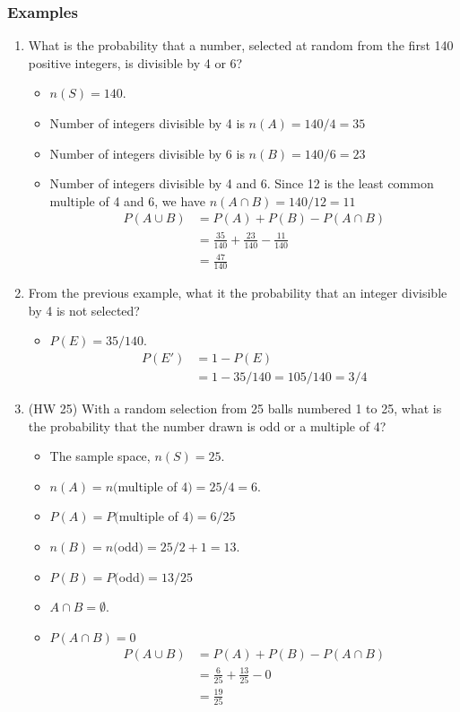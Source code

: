 \documentclass[14pt]{extarticle}
\begin{document}
\subsubsection{Examples}
\begin{enumerate}
	\item What is the probability that a number, selected at random from the first 140 positive integers, is divisible by 4 or 6?
	\begin{itemize}
		\item $n(S)= 140$.
		\item Number of integers divisible by 4 is $n(A) = 140/4 =35$
		\item Number of integers divisible by 6 is $n(B) = 140/6 =23$
		\item Number of integers divisible by 4 and 6. Since 12 is the least common multiple of 4 and 6, we have $n(A\cap B) = 140/12 =11$
		\begin{align*}
			P(A\cup B) &= P(A) + P(B) -P(A\cap B) \\
			& = \frac{35}{140}+ \frac{23}{140} - \frac{11}{140} \\
			& = \frac{47}{140}
		\end{align*}
	\end{itemize}
	\item From the previous example, what it the probability that an integer divisible by 4 is not selected?
	\begin{itemize}
		\item $P(E)= 35/140$.
		\begin{align*}
			P(E') &= 1-P(E) \\
			&= 1-35/140 = 105/140 = 3/4
		\end{align*}
	\end{itemize}
	\item (HW 25) With a random selection from 25 balls numbered 1 to 25, what is the probability that the number drawn is odd or a multiple of 4?
	\begin{itemize}
		\item The sample space, $n(S)=25$.
		\item $n(A) = n($multiple of 4$) = 25/4 = 6$.
		\item $P(A)=P($multiple of 4$) =6/25$
		\item $n(B) = n($odd$) = 25/2+1 = 13$.
		\item $P(B)=P($odd$) =13/25$
		\item $A\cap B = \emptyset$.
		\item $P(A\cap B)=0$
		\begin{align*}
			P(A\cup B) &= P(A) + P(B) -P(A\cap B) \\
			& = \frac{6}{25}+ \frac{13}{25} - 0 \\
			& = \frac{19}{25}
			\end{align*}
	\end{itemize}


\end{enumerate}
\end{document}
